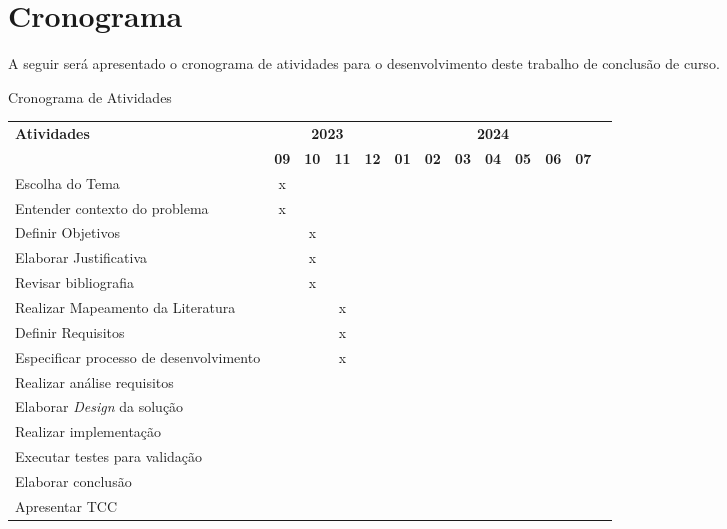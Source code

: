 

% 

% 







\textual









\chapter{Cronograma}
\label{cap:cronograma}
A seguir será apresentado o cronograma de atividades para o desenvolvimento deste trabalho de conclusão de curso.
\begin{quadro}[H]
    \centering
    \caption{Cronograma de Atividades}
    \begin{tabular}{|p{3.5cm}|c|c|c|c|c|c|c|c|c|c|c|c|}
        \hline
        \multirow{2}{*}{\textbf{Atividades}} & \multicolumn{4}{c|}{\textbf{2023}} & \multicolumn{7}{c|}{\textbf{2024}} \\ \cline{2-12}
        & \textbf{09} & \textbf{10} & \textbf{11} & \textbf{12} & \textbf{01} & \textbf{02} & \textbf{03} & \textbf{04} & \textbf{05} & \textbf{06} & \textbf{07} \\ \hline
        Escolha do Tema & x & & & & & & & & & & \\ \hline
        Entender contexto do problema & x & & & & & & & & & & \\ \hline
        Definir Objetivos & & x & & & & & & & & & \\ \hline
        Elaborar Justificativa & & x & & & & & & & & & \\ \hline
        Revisar bibliografia & & x & & & & & & & & & \\ \hline
        Realizar Mapeamento da Literatura & & & x & & & & & & & & \\ \hline
        Definir Requisitos & & & x & & & & & & & & \\ \hline
        Especificar processo de desenvolvimento & & & x & & & & & & & & \\ \hline
        Realizar análise requisitos & & & & & & & & & & & \\ \hline
        Elaborar \textit{Design} da solução & & & & & & & & & & & \\ \hline
        Realizar implementação & & & & & & & & & & & \\ \hline
        Executar testes para validação & & & & & & & & & & & \\ \hline
        Elaborar conclusão & & & & & & & & & & & \\ \hline
        Apresentar TCC & & & & & & & & & & & \\ \hline
      \end{tabular}
    \label{quad:cronograma}
\end{quadro}
% 

